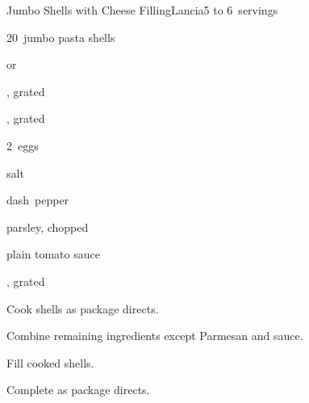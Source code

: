 \begin{recipe}{Jumbo Shells with Cheese Filling\FIXME}{Lancia}{5 to 6~servings}

\begin{ingredients}
\item 20~jumbo pasta shells
\item {}  or 
\item \C{1\half} , grated 
\item \C{1\half} , grated 
\item 2~eggs
\item \tp{\half} salt
\item dash~pepper
\item {} parsley, chopped 
\item \C{3\half} plain tomato sauce
\item \C{\quarter} , grated 
\end{ingredients}

\begin{directions}
\item Cook shells as package directs.
\item Combine remaining ingredients except Parmesan and sauce.
\item Fill cooked shells.
\item Complete as package directs.
\end{directions}

\end{recipe}
